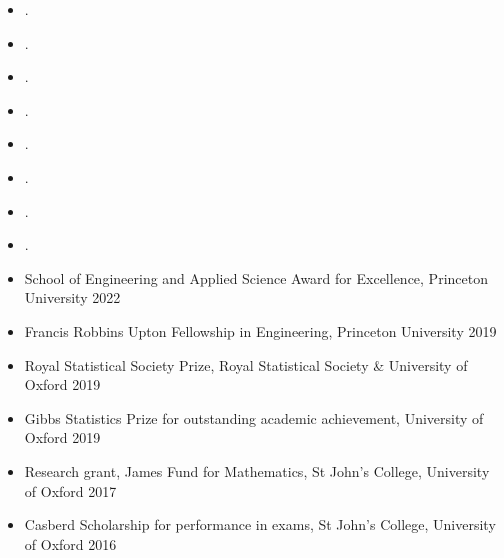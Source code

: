 \documentclass[
  date,
  number,
]{wgu-cv}
\begin{document}
\begin{itemize}
  \item {}.
  \item {}.
\end{itemize}

\begin{itemize}
  \item {}.
\end{itemize}

\begin{itemize}
  \item {}.
  \item {}.
  \item {}.
\end{itemize}

\begin{itemize}
  \item {}.
  \item {}.
\end{itemize}


\begin{itemize}
  \item School of Engineering and Applied Science Award for Excellence,
    Princeton University
    \hfill 2022%
  \item Francis Robbins Upton Fellowship in Engineering,
    Princeton University
    \hfill 2019%
  \item Royal Statistical Society Prize,
    Royal Statistical Society \& University of Oxford
    \hfill 2019%
  \item Gibbs Statistics Prize for outstanding academic achievement,
    University of Oxford
    \hfill 2019%
  \item Research grant, James Fund for Mathematics,
    St John's College, University of Oxford
    \hfill 2017%
  \item Casberd Scholarship for performance in exams,
    St John's College, University of Oxford
    \hfill 2016%
\end{itemize}
\end{document}
